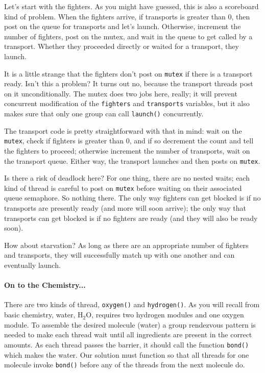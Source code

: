 Let's start with the fighters. As you might have guessed, this is also a scoreboard kind of problem. When the fighters arrive, if transports is greater than 0, then post on the queue for transports and let's launch. Otherwise, increment the number of fighters, post on the mutex, and wait in the queue to get called by a transport. Whether they proceeded directly or waited for a transport, they launch.

It is a little strange that the fighters don't post on \texttt{mutex} if there is a transport ready. Isn't this a problem? It turns out no, because the transport threads post on it unconditionally. The mutex does two jobs here, really; it will prevent concurrent modification of the \texttt{fighters} and \texttt{transports} variables, but it also makes sure that only one group can call \texttt{launch()} concurrently.

The transport code is pretty straightforward with that in mind: wait on the \texttt{mutex}, check if fighters is greater than 0, and if so decrement the count and tell the fighters to proceed; otherwise increment the number of transports, wait on the transport queue. Either way, the transport launches and then posts on \texttt{mutex}. 

Is there a risk of deadlock here? For one thing, there are no nested waits; each kind of thread is careful to post on \texttt{mutex} before waiting on their associated queue semaphore. So nothing there. The only way fighters can get blocked is if no transports are presently ready (and more will soon arrive); the only way that transports can get blocked is if no fighters are ready (and they will also be ready soon). 

How about starvation? As long as there are an appropriate number of fighters and transports, they will successfully match up with one another and can eventually launch. 

\paragraph{On to the Chemistry...}
There are two kinds of thread, \texttt{oxygen()} and \texttt{hydrogen()}. As you will recall from basic chemistry, water, H$_{2}$O, requires two hydrogen modules and one oxygen module. To assemble the desired molecule (water) a group rendezvous pattern is needed to make each thread wait until all ingredients are present in the correct amounts. As each thread passes the barrier, it should call the function \texttt{bond()} which makes the water. Our solution must function so that all threads for one molecule invoke \texttt{bond()} before any of the threads from the next molecule do.

